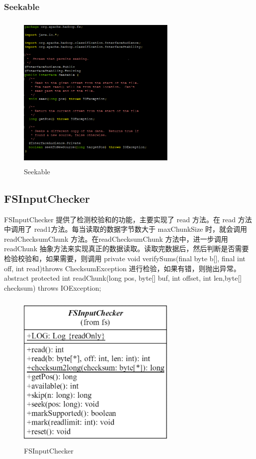 	
	 \subsubsection{Seekable}

	\begin{figure}[H]
		\centering
		\includegraphics[width=3in,height=3in]{Seekable.png}
		\caption{Seekable}
		\label{fig:graph6}
	\end{figure}
	
	\subsection{FSInputChecker}
	FSInputChecker 提供了检测校验和的功能，主要实现了 read 方法。在 read 方法中调用了 read1方法。每当读取的数据字节数大于 maxChunkSize 时，就会调用 readChecksumChunk 方法。在readChecksumChunk 方法中，进一步调用 readChunk 抽象方法来实现真正的数据读取。读取完数据后，然后判断是否需要检验校验和，如果需要，则调用 private void verifySums(final byte b[], final int off, int read)throws ChecksumException 进行检验，如果有错，则抛出异常。abstract protected int readChunk(long pos, byte[] buf, int offset, int len,byte[] checksum) throws IOException;
	
	\begin{figure}[H]
		\centering
		\includegraphics[width=3in,height=3in]{FSInputChecker.png}
		\caption{FSInputChecker}
		\label{fig:graph7}
	\end{figure}
